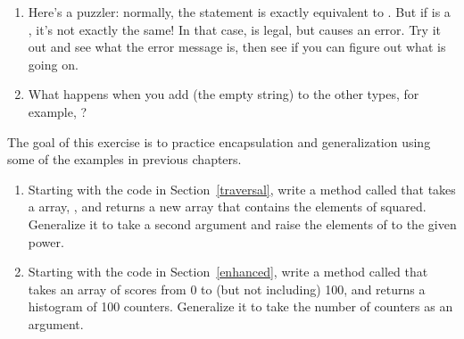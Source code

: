 \begin{exercise}
\begin{enumerate}
\item Here's a puzzler: normally, the statement  is exactly equivalent to .
But if  is a , it's not exactly the same!
In that case,  is legal, but  causes an error.
Try it out and see what the error message is, then see if you can figure out what is going on.

\item What happens when you add  (the empty string) to the other types, for example, ?


\end{enumerate}

\end{exercise}


\begin{exercise}  %

The goal of this exercise is to practice encapsulation and generalization using some of the examples in previous chapters.

\begin{enumerate}

\item Starting with the code in Section~\ref{traversal}, write a method called  that takes a  array, , and returns a new array that contains the elements of  squared.
Generalize it to take a second argument and raise the elements of  to the given power.

\item Starting with the code in Section~\ref{enhanced}, write a method called  that takes an  array of scores from 0 to (but not including) 100, and returns a histogram of 100 counters.
Generalize it to take the number of counters as an argument.

\end{enumerate}

\end{exercise}


